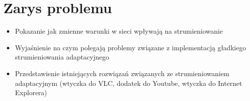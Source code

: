 \chapter{Zarys problemu}
\label{cha:rozdzial3}

\begin{itemize}
\item Pokazanie jak zmienne warunki w sieci wpływają na strumieniowanie
\item Wyjaśnienie na czym polegają problemy związane z implementacją gładkiego strumieniowania adaptacyjnego
\item Przedstawienie istniejących rozwiązań związanych ze strumieniowaniem adaptacyjnym (wtyczka do VLC, dodatek do Youtube, wtyczka do Internet Explorera)
\end{itemize}
